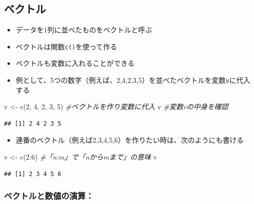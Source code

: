 \documentclass[
]{book}
\newenvironment{Shaded}{\begin{snugshade}}{\end{snugshade}}
\newcommand{\CommentTok}[1]{\textcolor[rgb]{0.56,0.35,0.01}{\textit{#1}}}
\newcommand{\DecValTok}[1]{\textcolor[rgb]{0.00,0.00,0.81}{#1}}
\newcommand{\FunctionTok}[1]{\textcolor[rgb]{0.00,0.00,0.00}{#1}}
\newcommand{\NormalTok}[1]{#1}
\newcommand{\OtherTok}[1]{\textcolor[rgb]{0.56,0.35,0.01}{#1}}
\newcommand{\SpecialCharTok}[1]{\textcolor[rgb]{0.00,0.00,0.00}{#1}}
\providecommand{\tightlist}{%
  \setlength{\itemsep}{0pt}\setlength{\parskip}{0pt}}
\begin{document}
\hypertarget{ux30d9ux30afux30c8ux30eb}{%
\subsection{ベクトル}\label{ux30d9ux30afux30c8ux30eb}}

\begin{itemize}
\tightlist
\item
  データを1列に並べたものをベクトルと呼ぶ
\item
  ベクトルは関数\texttt{c()}を使って作る
\item
  ベクトルも変数に入れることができる
\item
  例として、5つの数字（例えば、2,4,2,3,5）を並べたベクトルを変数\texttt{v}に代入する
\end{itemize}

\begin{Shaded}
\begin{Highlighting}[]
\NormalTok{v }\OtherTok{\textless{}{-}} \FunctionTok{c}\NormalTok{(}\DecValTok{2}\NormalTok{, }\DecValTok{4}\NormalTok{, }\DecValTok{2}\NormalTok{, }\DecValTok{3}\NormalTok{, }\DecValTok{5}\NormalTok{) }\CommentTok{\#ベクトルを作り変数に代入}
\NormalTok{v }\CommentTok{\#変数vの中身を確認}
\end{Highlighting}
\end{Shaded}

\begin{verbatim}
## [1] 2 4 2 3 5
\end{verbatim}

\begin{itemize}
\tightlist
\item
  連番のベクトル（例えば2,3,4,5,6）を作りたい時は、次のようにも書ける
\end{itemize}

\begin{Shaded}
\begin{Highlighting}[]
\NormalTok{v }\OtherTok{\textless{}{-}} \FunctionTok{c}\NormalTok{(}\DecValTok{2}\SpecialCharTok{:}\DecValTok{6}\NormalTok{) }\CommentTok{\#「n:m」で「nからmまで」の意味}
\NormalTok{v}
\end{Highlighting}
\end{Shaded}

\begin{verbatim}
## [1] 2 3 4 5 6
\end{verbatim}

\hypertarget{ux30d9ux30afux30c8ux30ebux3068ux6570ux5024ux306eux6f14ux7b97}{%
\subsubsection*{ベクトルと数値の演算：}\label{ux30d9ux30afux30c8ux30ebux3068ux6570ux5024ux306eux6f14ux7b97}}
\end{document}
